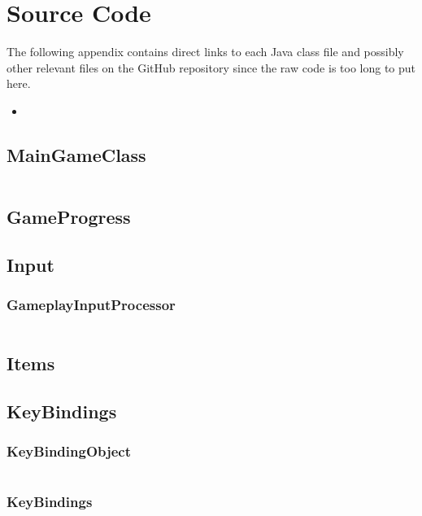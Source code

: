 \documentclass[12p]{article}
\begin{document}

\section{Source Code}

The following appendix contains direct links to each Java class file and possibly other relevant files on the GitHub repository since the raw code is too long to put here.

\begin{itemize}
  \item 
\end{itemize}

\subsection{MainGameClass} \label{MainGameClass.java}
\inputminted[linenos,breaklines]{java}{code/MainGameClass.java}

\subsection{GameProgress}

\subsection{Input}
\subsubsection{GameplayInputProcessor} \label{GameplayInputProcessor.java}
\inputminted[linenos,breaklines]{java}{code/Input/GameplayInputProcessor.java}

\subsection{Items}

\subsection{KeyBindings}
\subsubsection{KeyBindingObject} \label{KeyBindingObject.java}
\inputminted[linenos,breaklines]{java}{code/KeyBindings/KeyBindingObject.java}
\subsubsection{KeyBindings} \label{KeyBindings.java}
\inputminted[linenos,breaklines]{java}{code/KeyBindings/KeyBindings.java}
\end{document}
